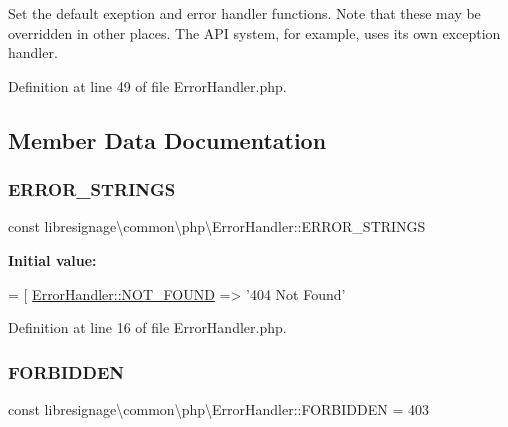 Set the default exeption and error handler functions. Note that these may be overridden in other places. The A\+PI system, for example, uses it\textquotesingle{}s own exception handler. 

Definition at line 49 of file Error\+Handler.\+php.



\subsection{Member Data Documentation}
\mbox{\label{classlibresignage_1_1common_1_1php_1_1ErrorHandler_a4116c0eb668b7f2d2564f3fde2b36424}} 
\subsubsection{\texorpdfstring{E\+R\+R\+O\+R\+\_\+\+S\+T\+R\+I\+N\+GS}{ERROR\_STRINGS}}
{\footnotesize\ttfamily const libresignage\textbackslash{}common\textbackslash{}php\textbackslash{}\+Error\+Handler\+::\+E\+R\+R\+O\+R\+\_\+\+S\+T\+R\+I\+N\+GS}

{\bfseries Initial value\+:}
\begin{DoxyCode}
= [
        \hyperlink{classlibresignage_1_1common_1_1php_1_1ErrorHandler_a4c0a076d9365e17271df419a5a821221}{ErrorHandler::NOT\_FOUND} => \textcolor{stringliteral}{'404 Not Found'}
\end{DoxyCode}


Definition at line 16 of file Error\+Handler.\+php.

\mbox{\label{classlibresignage_1_1common_1_1php_1_1ErrorHandler_af0646311186ddbe7d2b5944c37b84bc1}} 
\subsubsection{\texorpdfstring{F\+O\+R\+B\+I\+D\+D\+EN}{FORBIDDEN}}
{\footnotesize\ttfamily const libresignage\textbackslash{}common\textbackslash{}php\textbackslash{}\+Error\+Handler\+::\+F\+O\+R\+B\+I\+D\+D\+EN = 403}



